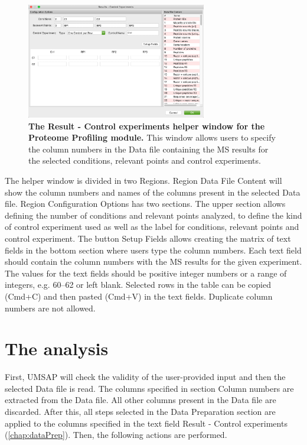 \begin{figure}[h]
    \centering
    \includegraphics[width=0.7\textwidth]{./IMAGES/MOD-PROTPROF/protprof-rescontrol.jpg}
    \caption[The Result - Control experiments helper window for the Proteome Profiling module]{\textbf{The Result - Control experiments helper window for the Proteome Profiling module.} This window allows users to specify the column numbers in the Data file containing the MS results for the selected conditions, relevant points and control experiments.} 
    \label{fig:protprofResControlWindow}
    \vspace{-5pt} 	
\end{figure}

The helper window is divided in two Regions. Region Data File Content will show the 
column numbers and names of the columns present in the selected Data file. Region
Configuration Options has two sections. The upper section allows defining the number
of conditions and relevant points analyzed, to define the kind of control experiment
used as well as the label for conditions, relevant points and control experiment.
The button Setup Fields allows creating the matrix of text fields in the bottom section
where users type the column numbers. Each text field should contain the column
numbers with the MS results for the given experiment. The values for the text fields
should be positive integer numbers or a range of integers, e.g. 
\numrange[range-phrase=--]{60}{62} or left blank. Selected rows in the table can
be copied (Cmd+C) and then pasted (Cmd+V) in the text fields. Duplicate column numbers
are not allowed. 

\section{The analysis}
\label{sec:protprofTTest}

First, UMSAP will check the validity of the user-provided input and then the selected
Data file is read. The columns specified in section Column numbers are extracted
from the Data file. All other columns present in the Data file are discarded. After
this, all steps selected in the Data Preparation section are applied to the columns
specified in the text field Result - Control experiments (\autoref{chap:dataPrep}).
Then, the following actions are performed.

